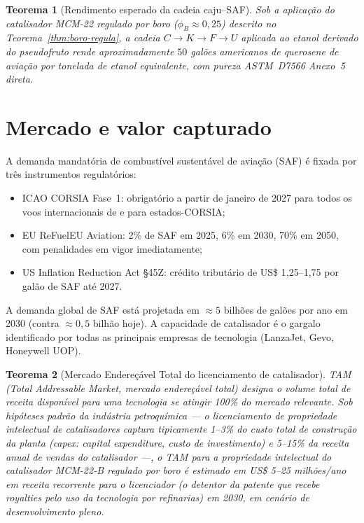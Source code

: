 \documentclass[12pt,a4paper,twoside]{book}
\theoremstyle{plain}
\newtheorem{teorema}{Teorema}[section]
\theoremstyle{definition}
\theoremstyle{definition}
\begin{document}
\begin{teorema}[Rendimento esperado da cadeia caju--SAF]
\label{thm:caju-saf}
Sob a aplicação do catalisador MCM-22 regulado por boro
($\phi_{B} \approx 0{,}25$) descrito no Teorema~\ref{thm:boro-regula},
a cadeia $C \to K \to F \to U$ aplicada ao etanol derivado do
pseudofruto rende aproximadamente $50$ galões americanos de querosene de
aviação por tonelada de etanol equivalente, com pureza ASTM~D7566 Anexo~5
direta.
\end{teorema}

\section{Mercado e valor capturado}

A demanda mandatória de combustível sustentável de aviação (SAF) é fixada
por três instrumentos regulatórios:

\begin{itemize}
  \item ICAO CORSIA Fase~1: obrigatório a partir de janeiro de 2027 para
        todos os voos internacionais de e para estados-CORSIA;
  \item EU ReFuelEU Aviation: 2\% de SAF em 2025, 6\% em 2030,
        70\% em 2050, com penalidades em vigor imediatamente;
  \item US Inflation Reduction Act §45Z: crédito tributário de
        US\$ 1{,}25--1{,}75 por galão de SAF até 2027.
\end{itemize}

A demanda global de SAF está projetada em $\approx 5$ bilhões de galões
por ano em 2030 (contra $\approx 0{,}5$ bilhão hoje). A capacidade de
catalisador é o gargalo identificado por todas as principais empresas
de tecnologia (LanzaJet, Gevo, Honeywell UOP).

\begin{teorema}[Mercado Endereçável Total do licenciamento de catalisador]
\label{thm:tam-catal}
TAM (\emph{Total Addressable Market}, mercado endereçável total) designa o
volume total de receita disponível para uma tecnologia se atingir 100\% do
mercado relevante.
Sob hipóteses padrão da indústria petroquímica --- o licenciamento de
propriedade intelectual de catalisadores captura tipicamente 1--3\% do custo
total de construção da planta (\emph{capex}: capital expenditure, custo de
investimento) e 5--15\% da receita anual de vendas do catalisador ---, o TAM
para a propriedade intelectual do catalisador MCM-22-B regulado por boro é
estimado em US\$ 5--25 milhões/ano em receita recorrente para o
\emph{licenciador} (o detentor da patente que recebe royalties pelo uso da
tecnologia por refinarias) em 2030, em cenário de desenvolvimento pleno.
\end{teorema}
\end{document}
